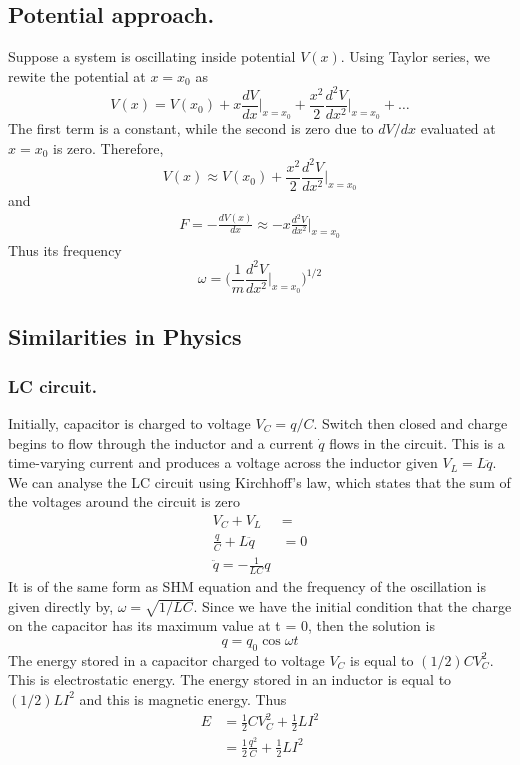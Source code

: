 \documentclass[../../../main.tex]{subfiles}
\begin{document}
\subsection*{Potential approach.} Suppose a system is oscillating inside potential $V(x)$. Using Taylor series, we rewite the potential at $x=x_0$ as
\begin{equation*}
    V(x)=V(x_0)+x\frac{dV}{dx}\bigg|_{x=x_0}+\frac{x^2}{2}\frac{d^2V}{dx^2}\bigg|_{x=x_0}+\dots
\end{equation*}
The first term is a constant, while the second is zero due to $dV/dx$ evaluated at $x=x_0$ is zero. Therefore, 
\begin{equation*}
    V(x)\approx V(x_0)+\frac{x^2}{2}\frac{d^2V}{dx^2}\bigg|_{x=x_0}
\end{equation*}
and 
\begin{align*}
    F=-\frac{dV(x)}{dx}\approx-x\frac{d^2V}{dx^2}\bigg|_{x=x_0}
\end{align*}
Thus its frequency
\begin{equation*}
    \omega=\biggl(\frac{1}{m}\frac{d^2V}{dx^2}\bigg|_{x=x_0}\biggr)^{1/2}
\end{equation*} 

\subsection*{Similarities in Physics}
\subsubsection*{LC circuit.} Initially, capacitor is charged to voltage $V_C=q/C$. Switch then closed and  charge begins to flow through the inductor and a current $\dot{q}$ flows in the circuit. This is a time-varying current and produces a voltage across the inductor given $V_L=L\ddot{q}$. We can analyse the LC circuit using Kirchhoff's law, which states that the sum of the voltages around the circuit is zero
\begin{align*}
    V_C+V_L&=\\
    \frac{q}{C}+L\ddot{q}&=0\\
    \ddot{q}=-\frac{1}{LC}q
\end{align*}
It is of the same form as SHM equation and the frequency of the oscillation is given directly by, $\omega = \sqrt{1/LC}$. Since we have the initial condition that the charge on the capacitor has its maximum value at t = 0, then the solution is
\begin{equation*}
    q=q_0\cos\omega t
\end{equation*}
The energy stored in a capacitor charged to voltage $V_C$ is equal to $(1/2) CV_C^2$. This is electrostatic energy. The energy stored in an inductor is equal to $(1/2) LI^2$ and this is magnetic energy. Thus \begin{align*}
    E&=\frac{1}{2}CV_C^2+\frac{1}{2}LI^2\\
    &=\frac{1}{2}\frac{q^2}{C}+\frac{1}{2}LI^2
\end{align*}
\end{document}
